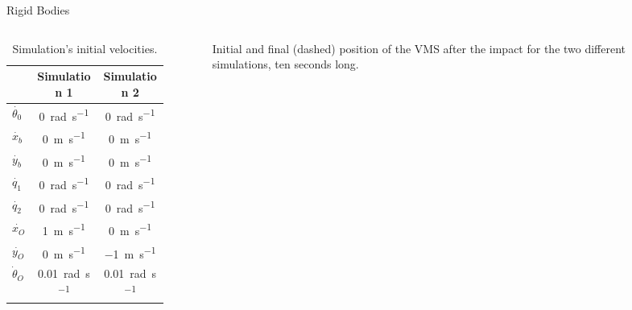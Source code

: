 \begin{frame}{Rigid Bodies}
    \begin{columns}
        \begin{column}{0.5\textwidth}
            \begin{table}
                \caption{Simulation's initial velocities.}
                \begin{center}
                \begin{tabular}{lcc}
                    \hline
                    &\textbf{Simulation 1}&\textbf{Simulation 2}\\
                \hline
                $\dot{\theta_0}$&\SI{0}{\radian\per\second}&\SI{0}{\radian\per\second}\\
                $\dot{x_b}$&\SI{0}{\metre\per\second}&\SI{0}{\metre\per\second}\\
                $\dot{y_b}$&\SI{0}{\metre\per\second}&\SI{0}{\metre\per\second}\\
                $\dot{q_1}$&\SI{0}{\radian\per\second}&\SI{0}{\radian\per\second}\\
                $\dot{q_2}$&\SI{0}{\radian\per\second}&\SI{0}{\radian\per\second}\\
                $\dot{x_O}$&\SI{1}{\metre\per\second}&\SI{0}{\metre\per\second}\\
                $\dot{y_O}$&\SI{0}{\metre\per\second}&\SI{-1}{\metre\per\second}\\
                $\dot{\theta}_O$&\SI{0.01}{\radian\per\second}&\SI{0.01}{\radian\per\second}\\
                \hline
                \end{tabular}
                \end{center}
                \end{table}
        \end{column}
        \begin{column}{0.5\textwidth}
            \begin{figure}
                \centering
                \caption{Initial and final (dashed) position of the VMS after the impact for the two different simulations, ten seconds long.}
              \end{figure}
        \end{column}
    \end{columns}
\end{frame}

